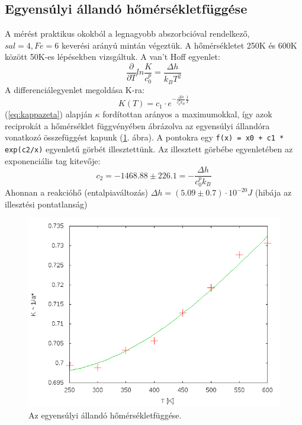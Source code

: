 \documentclass[20pt]{article}
\numberwithin{equation}{section}
\numberwithin{figure}{section}
\numberwithin{table}{section}
\begin{document}
	\subsection{Egyensúlyi állandó hőmérsékletfüggése}
	A mérést praktikus okokból a legnagyobb abszorbcióval rendelkező, $sal=4, Fe=6$ keverési arányú mintán végeztük. A hőmérsékletet 250K és 600K között 50K-es lépésekben vizsgáltuk. A van't Hoff egyenlet:
	\begin{equation}
	\frac{\partial}{\partial T} ln \frac{K}{c^p_0} = \frac{\Delta h}{k_B T^2}
	\end{equation}
	A differenciálegyenlet megoldása K-ra:
	\begin{equation}
	K (T) = c_1 \cdot e^{-\frac{\Delta h}{c^p_0 k_B} \frac{1}{T}}
	\end{equation}
	(\ref{eq:kappazeta}) alapján $\kappa$ fordítottan arányos a maximumokkal, így azok reciprokát a hőmérséklet függvényében ábrázolva az egyensúlyi állandóra vonatkozó összefüggést kapunk (\ref{fig:tfugges}. ábra). A pontokra egy \texttt{f(x) = x0 + c1 * exp(c2/x)} egyenletű görbét illesztettünk. Az illesztett görbébe egyenletében az exponenciális tag kitevője:
	\begin{equation*}
	c_2 = -1468.88 \pm 226.1 = -\frac{\Delta h}{c^p_0 k_B}
	\end{equation*}
	Ahonnan a reakcióhő (entalpiaváltozás) $\Delta h = (5.09\pm 0.7) \cdot 10 ^{-20} J$ (hibája az illesztési pontatlanság)
	\begin{figure}%
		\centering
		\includegraphics[width=.8\textwidth]{tfugges.png}
		\caption{Az egyensúlyi állandó hőmérsékletfüggése. \label{fig:tfugges}}
	\end{figure}
	
\end{document}

